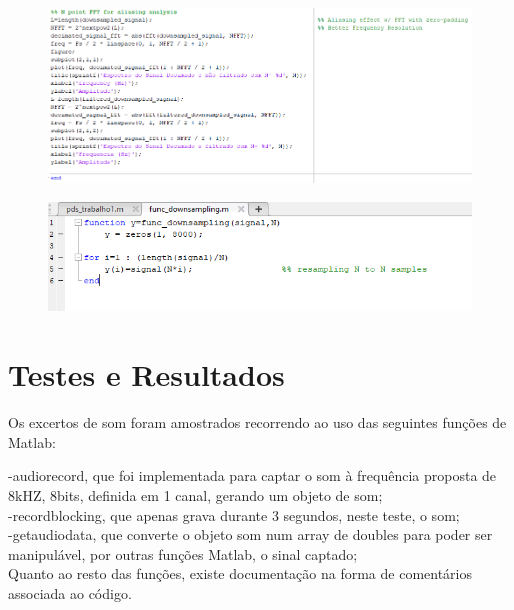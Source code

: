 \documentclass{article}
\begin{document}
\newpage
\begin{figure}[h]
\begin{center}
\includegraphics[width=19cm]{matlab_test_images/code_imgs/c4.png}
\end{center}
\end{figure}
\newpage
\begin{figure}[h]
\begin{center}
\includegraphics[width=19cm]{matlab_test_images/code_imgs/c5.png}
\end{center}
\end{figure}
\newpage

\section{Testes e Resultados}    

Os excertos de som foram amostrados recorrendo ao uso das seguintes funções de Matlab:
\raggedright
\vspace{5mm} %

    -audiorecord, que foi implementada para captar o som à frequência proposta de 8kHZ, 8bits, definida em 1 canal, gerando um objeto de som; \\
    -recordblocking, que apenas grava durante 3 segundos, neste teste, o som; \\
    -getaudiodata, que converte o objeto som num array de doubles para poder ser manipulável, por outras funções Matlab, o sinal captado; \\
    
    Quanto ao resto das funções, existe documentação na forma de comentários associada ao código.
    
\end{document}
